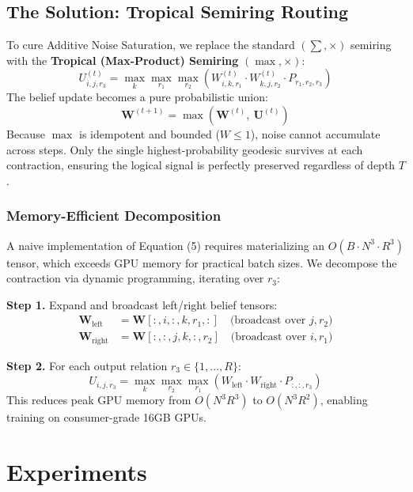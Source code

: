 \documentclass[11pt,a4paper]{article}
\begin{document}
\subsection{The Solution: Tropical Semiring Routing}
To cure Additive Noise Saturation, we replace the standard $(\sum, \times)$ semiring with the \textbf{Tropical (Max-Product) Semiring} $(\max, \times)$:
\begin{equation}
    U_{i,j,r_3}^{(t)} = \max_{k} \max_{r_1} \max_{r_2} \left( W_{i,k,r_1}^{(t)} \cdot W_{k,j,r_2}^{(t)} \cdot P_{r_1, r_2, r_3} \right)
\end{equation}
The belief update becomes a pure probabilistic union:
\begin{equation}
    \mathbf{W}^{(t+1)} = \max\left(\mathbf{W}^{(t)},\ \mathbf{U}^{(t)}\right)
\end{equation}
Because $\max$ is idempotent and bounded ($W \leq 1$), noise cannot accumulate across steps. Only the single highest-probability geodesic survives at each contraction, ensuring the logical signal is perfectly preserved regardless of depth $T$.

\subsubsection{Memory-Efficient Decomposition}
A naive implementation of Equation (5) requires materializing an $O(B \cdot N^3 \cdot R^3)$ tensor, which exceeds GPU memory for practical batch sizes. We decompose the contraction via dynamic programming, iterating over $r_3$:

\textbf{Step 1.} Expand and broadcast left/right belief tensors:
\begin{align}
    \mathbf{W}_{\text{left}} &= \mathbf{W}[:, i, :, k, r_1, :] \quad \text{(broadcast over } j, r_2\text{)} \\
    \mathbf{W}_{\text{right}} &= \mathbf{W}[:, :, j, k, :, r_2] \quad \text{(broadcast over } i, r_1\text{)}
\end{align}

\textbf{Step 2.} For each output relation $r_3 \in \{1, \ldots, R\}$:
\begin{equation}
    U_{i,j,r_3} = \max_k \max_{r_2} \max_{r_1} \left( W_{\text{left}} \cdot W_{\text{right}} \cdot P_{:,:,r_3} \right)
\end{equation}
This reduces peak GPU memory from $O(N^3 R^3)$ to $O(N^3 R^2)$, enabling training on consumer-grade 16GB GPUs.

\section{Experiments}
\end{document}
